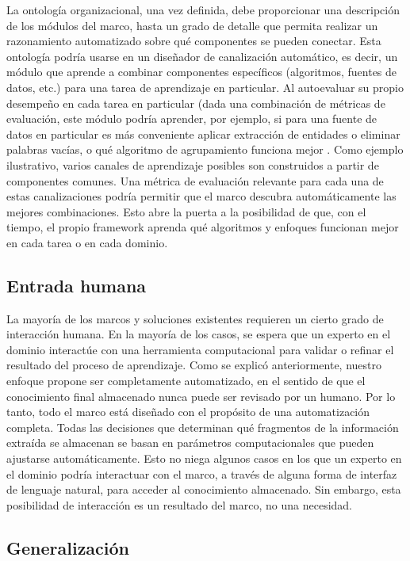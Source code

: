 La ontología organizacional, una vez definida, debe proporcionar una descripción de los módulos del marco, hasta un grado de detalle que permita realizar un razonamiento automatizado sobre qué componentes se pueden conectar.
Esta ontología podría usarse en un diseñador de canalización automático, es decir, un módulo que aprende a combinar componentes específicos (algoritmos, fuentes de datos, etc.) para una tarea de aprendizaje en particular.
Al autoevaluar su propio desempeño en cada tarea en particular (dada una combinación de métricas de evaluación, este módulo podría aprender, por ejemplo, si para una fuente de datos en particular es más conveniente aplicar extracción de entidades o eliminar palabras vacías, o qué algoritmo de agrupamiento funciona mejor .
Como ejemplo ilustrativo, varios canales de aprendizaje posibles son construidos a partir de componentes comunes.
Una métrica de evaluación relevante para cada una de estas canalizaciones podría permitir que el marco descubra automáticamente las mejores combinaciones.
Esto abre la puerta a la posibilidad de que, con el tiempo, el propio framework aprenda qué algoritmos y enfoques funcionan mejor en cada tarea o en cada dominio.

\subsection{Entrada humana}

La mayoría de los marcos y soluciones existentes requieren un cierto grado de interacción humana. En la mayoría de los casos, se espera que un experto en el dominio interactúe con una herramienta computacional para validar o refinar el resultado del proceso de aprendizaje.
Como se explicó anteriormente, nuestro enfoque propone ser completamente automatizado, en el sentido de que el conocimiento final almacenado nunca puede ser revisado por un humano. Por lo tanto, todo el marco está diseñado con el propósito de una automatización completa. Todas las decisiones que determinan qué fragmentos de la información extraída se almacenan se basan en parámetros computacionales que pueden ajustarse automáticamente.
Esto no niega algunos casos en los que un experto en el dominio podría interactuar con el marco, a través de alguna forma de interfaz de lenguaje natural, para acceder al conocimiento almacenado.
Sin embargo, esta posibilidad de interacción es un resultado del marco, no una necesidad.

\subsection{Generalización}

